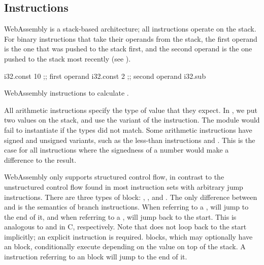 \documentclass[00-main.tex]{subfiles}
\begin{document}
\subsection{Instructions}

WebAssembly is a stack-based architecture; all instructions operate on the stack.
For binary instructions that take their operands from the stack, the first operand is the one that was pushed to the stack first, and the second operand is the one pushed to the stack most recently (see ).

\begin{listing}[t]
  \begin{WasmListing}
    i32.const 10 ;; first operand
    i32.const 2  ;; second operand
    i32.sub
  \end{WasmListing}
  \caption{WebAssembly instructions to calculate .}
  \label{lst:wasm example sub instr}
\end{listing}

All arithmetic instructions specify the type of value that they expect. In , we put two  values on the stack, and use the  variant of the  instruction.
The module would fail to instantiate if the types did not match.
Some arithmetic instructions have signed and unsigned variants, such as the less-than instructions  and .
This is the case for all instructions where the signedness of a number would make a difference to the result.

WebAssembly only supports structured control flow, in contrast to the unstructured control flow found in most instruction sets with arbitrary jump instructions.
There are three types of block: , , and .
The only difference between  and  is the semantics of branch instructions.
When referring to a ,  will jump to the end of it, and when referring to a ,  will jump back to the start.
This is analogous to  and  in C, respectively.
Note that  does not loop back to the start implicitly; an explicit  instruction is required.
 blocks, which may optionally have an  block, conditionally execute depending on the value on top of the stack.
A  instruction referring to an  block will jump to the end of it.
\end{document}
